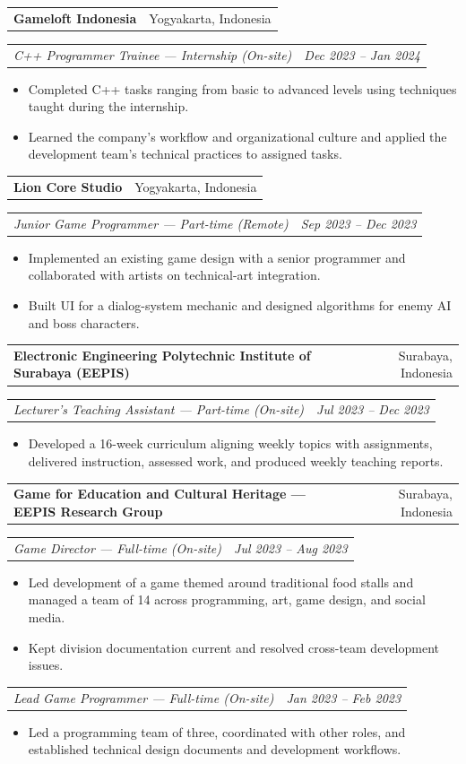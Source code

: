 \documentclass[10pt,a4paper]{article}
\makeatletter
\newcommand{\company}[2]{%
  \vspace{0.28em}%
  \begin{tabularx}{\textwidth}{@{}Xr@{}}
    \textbf{#1} & \textcolor{muted}{#2}
  \end{tabularx}\vspace{-0.45em}
}
\newcommand{\role}[2]{%
  \begin{tabularx}{\textwidth}{@{}Xr@{}}
    \textit{#1} & \textit{#2}
  \end{tabularx}\vspace{-0.55em}
}
\makeatother
\begin{document}
\company{Gameloft Indonesia}{Yogyakarta, Indonesia}
\role{C++ Programmer Trainee --- Internship (On-site)}{Dec 2023 -- Jan 2024}
\begin{itemize}
  \item Completed C++ tasks ranging from basic to advanced levels using techniques taught during the internship.
  \item Learned the company's workflow and organizational culture and applied the development team's technical practices to assigned tasks.
\end{itemize}

\company{Lion Core Studio}{Yogyakarta, Indonesia}
\role{Junior Game Programmer --- Part-time (Remote)}{Sep 2023 -- Dec 2023}
\begin{itemize}
  \item Implemented an existing game design with a senior programmer and collaborated with artists on technical-art integration.
  \item Built UI for a dialog-system mechanic and designed algorithms for enemy AI and boss characters.
\end{itemize}

\company{Electronic Engineering Polytechnic Institute of Surabaya (EEPIS)}{Surabaya, Indonesia}
\role{Lecturer's Teaching Assistant --- Part-time (On-site)}{Jul 2023 -- Dec 2023}
\begin{itemize}
  \item Developed a 16-week curriculum aligning weekly topics with assignments, delivered instruction, assessed work, and produced weekly teaching reports.
\end{itemize}

\company{Game for Education and Cultural Heritage --- EEPIS Research Group}{Surabaya, Indonesia}
\role{Game Director --- Full-time (On-site)}{Jul 2023 -- Aug 2023}
\begin{itemize}
  \item Led development of a game themed around traditional food stalls and managed a team of 14 across programming, art, game design, and social media.
  \item Kept division documentation current and resolved cross-team development issues.
\end{itemize}
\role{Lead Game Programmer --- Full-time (On-site)}{Jan 2023 -- Feb 2023}
\begin{itemize}
  \item Led a programming team of three, coordinated with other roles, and established technical design documents and development workflows.
\end{itemize}
\end{document}
